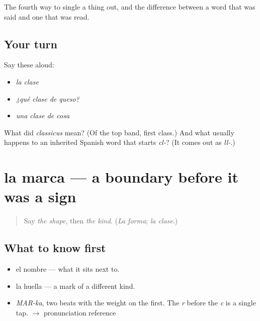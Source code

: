\begin{grammarlens}[title={What you've built}]
The fourth way to single a thing out, and the difference between a word that was said and one that was read.
\end{grammarlens}

\subsection*{Your turn}
Say these aloud:

\begin{itemize}
\raggedright
  \item \emph{la clase}
  \item \emph{¿qué clase de queso?}
  \item \emph{una clase de cosa}
\end{itemize}

\begin{tcolorbox}[breakable,colback=teal!4,colframe=teal!35!black,title={Before you move on}]
What did \emph{classicus} mean? (Of the top band, first class.) And what usually happens to an inherited Spanish word that starts \emph{cl-}? (It comes out as \emph{ll-}.)
\end{tcolorbox}
\section[la marca]{la marca — a boundary before it was a sign}

\label{lesson:ES-C358-marca}



\begin{quote}
Say \emph{the shape}, then \emph{the kind}. (\emph{La forma}; \emph{la clase}.)
\end{quote}

\subsection*{What to know first}
\begin{itemize}
\raggedright
  \item el nombre — what it sits next to.
  \item la huella — a mark of a different kind.
\end{itemize}

\begin{sounds}
\begin{itemize}
\raggedright
  \item \emph{MAR-ka}, two beats with the weight on the first. The \emph{r} before the \emph{c} is a single tap. $\to$ pronunciation reference
\end{itemize}
\end{sounds}

